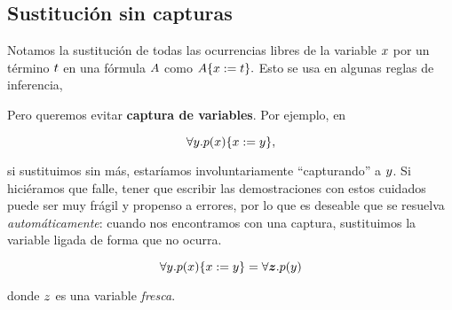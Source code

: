 \subsection{Sustitución sin capturas}\label{nd:sec:subst}

Notamos la sustitución de todas las ocurrencias libres de la variable $x$ por un término $t$ en una fórmula $A$ como
\(
    A\{x := t\}.
\)
Esto se usa en algunas reglas de inferencia,

\proofTreeForallE

Pero queremos evitar \textbf{captura de variables}. Por ejemplo, en

\[
    \forall y . p(x)\{x := y\},
\]

si sustituimos sin más, estaríamos involuntariamente ``capturando'' a $y$. Si hiciéramos que falle, tener que escribir las demostraciones con estos cuidados puede ser muy frágil y propenso a errores, por lo que es deseable que se resuelva \textit{automáticamente}: cuando nos encontramos con una captura, sustituimos la variable ligada de forma que no ocurra.

\[
    \forall y . p(x)\{x := y\} =
    \forall \bm{z} . p(y)
\]

donde $z$ es una variable \textit{fresca}.


